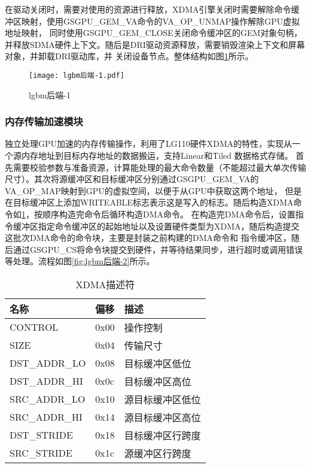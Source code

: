 在驱动关闭时，需要对使用的资源进行释放，XDMA引擎关闭时需要解除命令缓冲区映射，使用GSGPU\_GEM\_VA命令的VA\_OP\_UNMAP操作解除GPU虚拟地址映射​，
同时使用GSGPU\_GEM\_CLOSE关闭命令缓冲区的GEM对象句柄，并释放SDMA硬件上下文​。随后是DRI驱动资源释放，需要销毁渲染上下文和屏幕对象，并卸载DRI驱动库，并
关闭设备节点。整体结构如图\ref{fig:lgbm后端-1}所示。

\begin{figure}[H]
  \centering
  \texttt{[image: lgbm后端-1.pdf]}
  \caption{lgbm后端-1}
  \label{fig:lgbm后端-1}
\end{figure}  

\subsubsection{内存传输加速模块}

独立处理GPU加速的内存传输操作，利用了LG110硬件XDMA的特性，实现从一个源内存地址到目标内存地址的数据搬运，支持Linear和Tiled 数据格式存储。
首先需要校验参数与准备资源，计算能处理的最大命令数量（不能超过最大单次传输尺寸）。其次将源缓冲区和目标缓冲区分别通过GSGPU\_GEM\_VA的VA\_OP\_MAP映射到GPU的虚拟空间，以便于从GPU中获取这两个地址，
但是在目标缓冲区上添加WRITEABLE标志表示这是写入的标志。随后构造XDMA命令如\ref{tab:XDMA描述符}，按顺序构造完命令后循环构造DMA命令。
在构造完DMA命令后，设置指令缓冲区指定命令缓冲区的起始地址以及设置硬件类型为XDMA，随后构造提交这批次DMA命令的命令块，主要是封装之前构建的DMA命令和
指令缓冲区，随后通过GSGPU\_CS将命令块提交到硬件，并等待结果同步，进行超时或调用错误等处理。流程如图\ref{fig:lgbm后端-2}所示。

\begin{table}[H]  
  \centering
  \caption{XDMA描述符}
  \label{tab:XDMA描述符}
  \begin{tabular}{lll}
    \toprule
    名称  & 偏移 & 描述\\
    \midrule
    CONTROL & 0x00 & 操作控制\\
    SIZE & 0x04 & 传输尺寸\\
    DST\_ADDR\_LO & 0x08 & 目标缓冲区低位\\
    DST\_ADDR\_HI & 0x0c & 目标缓冲区高位\\
    SRC\_ADDR\_LO & 0x10 & 源目标缓冲区低位\\
    SRC\_ADDR\_HI & 0x14 & 源目标缓冲区高位\\
    DST\_STRIDE & 0x18 & 目标缓冲区行跨度\\
    SRC\_STRIDE & 0x1c & 源缓冲区行跨度\\
    \bottomrule
  \end{tabular}
  \note{}
\end{table}

